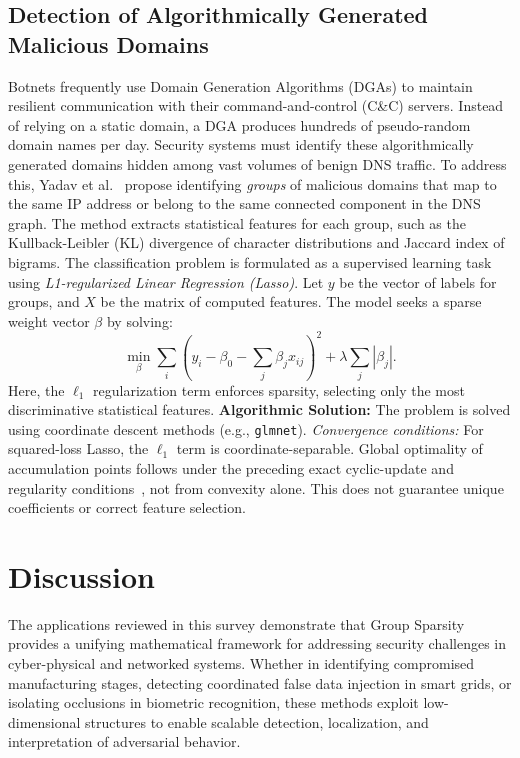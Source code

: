 \documentclass[12pt]{article}
\begin{document}
\subsection{Detection of Algorithmically Generated Malicious Domains}

Botnets frequently use Domain Generation Algorithms (DGAs) to maintain resilient communication with their command-and-control (C\&C) servers. Instead of relying on a static domain, a DGA produces hundreds of pseudo-random domain names per day. Security systems must identify these algorithmically generated domains hidden among vast volumes of benign DNS traffic.
To address this, Yadav et al.~\cite{Yadav2010} propose identifying \textit{groups} of malicious domains that map to the same IP address or belong to the same connected component in the DNS graph. The method extracts statistical features for each group, such as the Kullback-Leibler (KL) divergence of character distributions and Jaccard index of bigrams.
The classification problem is formulated as a supervised learning task using \textit{L1-regularized Linear Regression (Lasso)}. Let $y$ be the vector of labels for groups, and $X$ be the matrix of computed features. The model seeks a sparse weight vector $\beta$ by solving:
\[
    \min_{\beta} \sum_{i} \left( y_i - \beta_0 - \sum_{j} \beta_j x_{ij} \right)^2 + \lambda \sum_{j} |\beta_j|.
\]
Here, the $\ell_1$ regularization term enforces sparsity, selecting only the most discriminative statistical features.
\textbf{Algorithmic Solution:} The problem is solved using coordinate descent methods (e.g., \texttt{glmnet}).
\textit{Convergence conditions:} For squared-loss Lasso, the $\ell_1$ term is coordinate-separable. Global optimality of accumulation points follows under the preceding exact cyclic-update and regularity conditions~\cite{Tseng2001}, not from convexity alone. This does not guarantee unique coefficients or correct feature selection.


\section{Discussion}

The applications reviewed in this survey demonstrate that Group Sparsity provides a unifying mathematical framework for addressing security challenges in cyber-physical and networked systems. Whether in identifying compromised manufacturing stages, detecting coordinated false data injection in smart grids, or isolating occlusions in biometric recognition, these methods exploit low-dimensional structures to enable scalable detection, localization, and interpretation of adversarial behavior.
\end{document}
